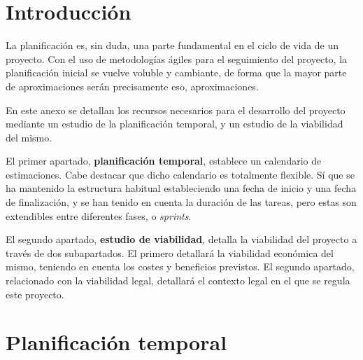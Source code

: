 
\section{Introducción}

La planificación es, sin duda, una parte fundamental en el ciclo de vida de un proyecto. 
Con el uso de metodologías ágiles para el seguimiento del proyecto, la planificación inicial se vuelve voluble y cambiante, de forma que la mayor parte de aproximaciones serán precisamente eso, aproximaciones.

En este anexo se detallan los recursos necesarios para el desarrollo del proyecto mediante un estudio de la planificación temporal, y un estudio de la viabilidad del mismo. 

El primer apartado, \textbf{planificación temporal}, establece un calendario de estimaciones. Cabe destacar que dicho calendario es totalmente flexible. Sí que se ha mantenido la estructura habitual estableciendo una fecha de inicio y una fecha de finalización, y se han tenido en cuenta la duración de las tareas, pero estas son extendibles entre diferentes fases, o \emph{sprints}.

El segundo apartado, \textbf{estudio de viabilidad}, detalla la viabilidad del proyecto a través de dos subapartados. El primero detallará la viabilidad económica del mismo, teniendo en cuenta los costes y beneficios previstos. El segundo apartado, relacionado con la viabilidad legal, detallará el contexto legal en el que se regula este proyecto. 

\newpage

\section{Planificación temporal}

